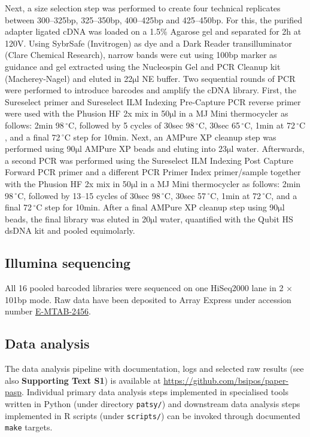 \documentclass[10pt]{article}
\newcommand{\mul}{\ensuremath{\mathrm{\mu l}}}
\newcommand{\C}{\,$^{\circ}\mathrm{C}$}
\begin{document}
Next, a size selection step was performed to create four technical replicates between 300--325bp, 325--350bp, 400--425bp and 425--450bp. For this, the purified adapter ligated cDNA was loaded on a 1.5\% Agarose gel and separated for 2h at 120V. Using SybrSafe (Invitrogen) as dye and a Dark Reader transilluminator (Clare Chemical Research), narrow bands were cut using 100bp marker as guidance and gel extracted using the Nucleospin Gel and PCR Cleanup kit (Macherey-Nagel) and eluted in 22{\mul} NE buffer.
Two sequential rounds of PCR were performed to introduce barcodes and amplify the cDNA library. First, the Sureselect primer and Sureselect ILM Indexing Pre-Capture PCR reverse primer were used with the Phusion HF 2x mix in 50{\mul} in a MJ Mini thermocycler as follows: 2min 98{\C}, followed by 5 cycles of 30sec 98{\C}, 30sec 65{\C}, 1min at 72{\C}, and a final 72{\C} step for 10min. Next, an AMPure XP cleanup step was performed using 90{\mul} AMPure XP beads and eluting into 23{\mul} water. Afterwards, a second PCR was performed using the Sureselect ILM Indexing Post Capture Forward PCR primer and a different PCR Primer Index primer/sample together with the Phusion HF 2x mix in 50{\mul} in a MJ Mini thermocycler as follows: 2min 98{\C}, followed by 13--15 cycles of 30sec 98{\C}, 30sec 57{\C}, 1min at 72{\C}, and a final 72{\C} step for 10min. After a final AMPure XP cleanup step using 90{\mul} beads, the final library was eluted in 20{\mul} water, quantified with the Qubit HS dsDNA kit and pooled equimolarly.

\subsection*{Illumina sequencing}

All 16 pooled barcoded libraries were sequenced on one HiSeq2000 lane in 2 $\times$ 101bp mode. Raw data have been deposited to Array Express under accession number \href{http://www.ebi.ac.uk/arrayexpress/experiments/E-MTAB-2456/}{E-MTAB-2456}.

\subsection*{Data analysis}

The data analysis pipeline with documentation, logs and selected raw results (see also \textbf{Supporting Text S1}) is available at \href{https://github.com/bsipos/paper-pasp}{https://github.com/bsipos/paper-pasp}. Individual primary data analysis steps implemented in specialised tools written in Python (under directory \texttt{patsy/})  and downstream data analysis steps implemented in R scripts (under \texttt{scripts/}) can be invoked through documented \texttt{make} targets.
\end{document}
